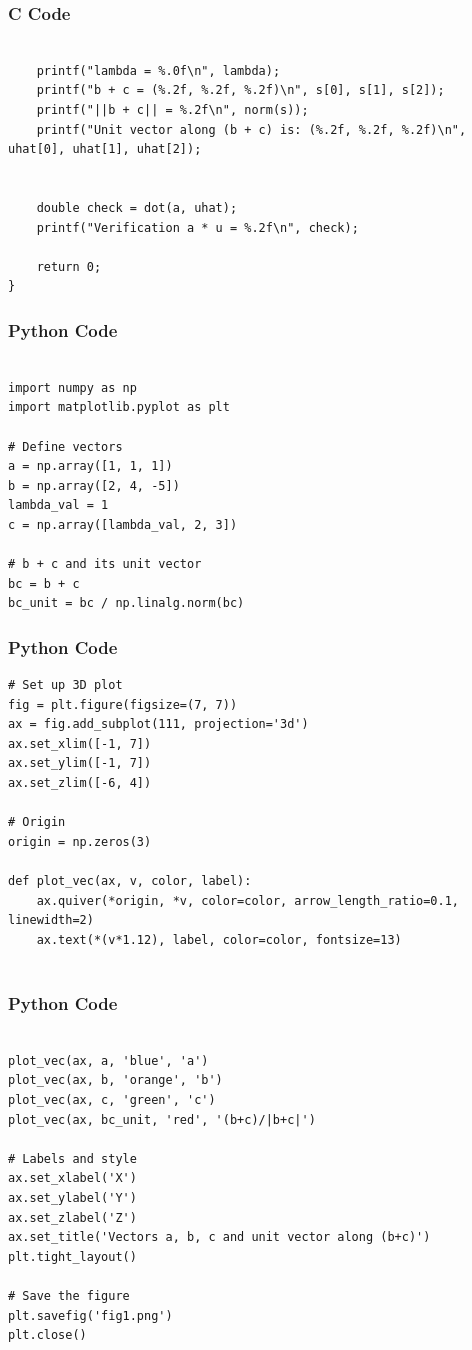 \documentclass{beamer}
\begin{document}
\begin{frame}[fragile]
    \frametitle{C Code}
    \begin{lstlisting}

    printf("lambda = %.0f\n", lambda);
    printf("b + c = (%.2f, %.2f, %.2f)\n", s[0], s[1], s[2]);
    printf("||b + c|| = %.2f\n", norm(s));
    printf("Unit vector along (b + c) is: (%.2f, %.2f, %.2f)\n", uhat[0], uhat[1], uhat[2]);

    
    double check = dot(a, uhat);
    printf("Verification a * u = %.2f\n", check);

    return 0;
}
    \end{lstlisting}
\end{frame}


\begin{frame}[fragile]
    \frametitle{Python Code}
    \begin{lstlisting}

import numpy as np
import matplotlib.pyplot as plt

# Define vectors
a = np.array([1, 1, 1])
b = np.array([2, 4, -5])
lambda_val = 1
c = np.array([lambda_val, 2, 3])

# b + c and its unit vector
bc = b + c
bc_unit = bc / np.linalg.norm(bc)

\end{lstlisting}
\end{frame}

\begin{frame}[fragile]
    \frametitle{Python Code}
    \begin{lstlisting}
# Set up 3D plot
fig = plt.figure(figsize=(7, 7))
ax = fig.add_subplot(111, projection='3d')
ax.set_xlim([-1, 7])
ax.set_ylim([-1, 7])
ax.set_zlim([-6, 4])

# Origin
origin = np.zeros(3)

def plot_vec(ax, v, color, label):
    ax.quiver(*origin, *v, color=color, arrow_length_ratio=0.1, linewidth=2)
    ax.text(*(v*1.12), label, color=color, fontsize=13)
  
    \end{lstlisting}
\end{frame}


\begin{frame}[fragile]
    \frametitle{Python Code}
    \begin{lstlisting}
    
plot_vec(ax, a, 'blue', 'a')
plot_vec(ax, b, 'orange', 'b')
plot_vec(ax, c, 'green', 'c')
plot_vec(ax, bc_unit, 'red', '(b+c)/|b+c|')

# Labels and style
ax.set_xlabel('X')
ax.set_ylabel('Y')
ax.set_zlabel('Z')
ax.set_title('Vectors a, b, c and unit vector along (b+c)')
plt.tight_layout()

# Save the figure
plt.savefig('fig1.png')
plt.close()  

    \end{lstlisting}
\end{frame}
\end{document}
